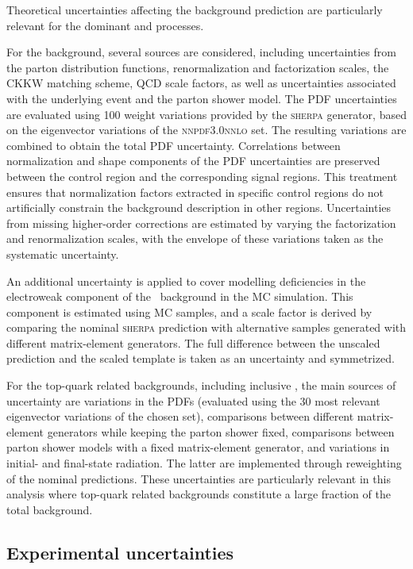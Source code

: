 Theoretical uncertainties affecting the background prediction are particularly relevant for the dominant \ztautau and \ttbar processes.  

For the \ztautau background, several sources are considered, including uncertainties from the parton distribution functions, renormalization and factorization scales, the CKKW matching scheme, QCD scale factors, as well as uncertainties associated with the underlying event and the parton shower model. The PDF uncertainties are evaluated using 100 weight variations provided by the \textsc{sherpa} generator, based on the eigenvector variations of the \textsc{nnpdf3.0nnlo} set. The resulting variations are combined to obtain the total PDF uncertainty. 
Correlations between normalization and shape components of the PDF uncertainties are preserved between the \ztautau control region and the corresponding signal regions. This treatment ensures that normalization factors extracted in specific control regions do not artificially constrain the background description in other regions. Uncertainties from missing higher-order corrections are estimated by varying the factorization and renormalization scales, with the envelope of these variations taken as the systematic uncertainty.

An additional uncertainty is applied to cover modelling deficiencies in the electroweak component of the \ztautau\ background in the MC simulation. This component is estimated using MC samples, and a scale factor is derived by comparing the nominal \textsc{sherpa} prediction with alternative samples generated with different matrix-element generators. The full difference between the unscaled prediction and the scaled template is taken as an uncertainty and symmetrized.

For the top-quark related backgrounds, including inclusive \ttbar, the main sources of uncertainty are variations in the PDFs (evaluated using the 30 most relevant eigenvector variations of the chosen set), comparisons between different matrix-element generators while keeping the parton shower fixed, comparisons between parton shower models with a fixed matrix-element generator, and variations in initial- and final-state radiation. The latter are implemented through reweighting of the nominal predictions. These uncertainties are particularly relevant in this analysis where top-quark related backgrounds constitute a large fraction of the total background.

\subsection{Experimental uncertainties}
\label{subsec:exp_syst}

